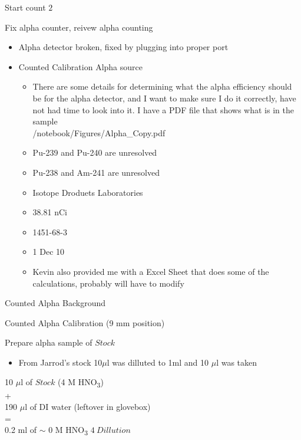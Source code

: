 \documentclass[idxtotoc,hyperref,openany,oneside]{labbook} %
\newcommand{\cmark}{\ding{51}}%
\newcommand{\done}{\rlap{$\square$}{\raisebox{2pt}{\large\hspace{1pt}\cmark}}%
  \hspace{-2.5pt}}
\newcommand{\tsbs}{\textsubscript}
\begin{document}
\begin{todolist}
\item[\done]{Start count $\boxed{2}$}
\item[\done]{Fix alpha counter, reivew alpha counting}
  \begin{itemize}
  \item{Alpha detector broken, fixed by plugging into proper port}
  \item{Counted Calibration Alpha source}
    \begin{itemize}
    \item{There are some details for determining
      what the alpha efficiency should be for the alpha
      detector, and I want to make sure I do it correctly,
      have not had time to look into it. I have a PDF file
      that shows what is in the sample\\
      /notebook/Figures/Alpha\_Copy.pdf}
    \item{Pu-239 and Pu-240 are unresolved}
    \item{Pu-238 and Am-241 are unresolved}
    \item{Isotope Droduets Laboratories}
    \item{38.81 nCi}
    \item{1451-68-3}
    \item{1 Dec 10}
    \item{Kevin also provided me with a Excel Sheet that does
      some of the calculations, probably will have to modify}
    \end{itemize}
  \end{itemize}
\item[\done]{Counted Alpha Background}
\item[\done]{Counted Alpha Calibration (9 mm position)}
\item[\done]{Prepare alpha sample of $\boxed{Stock}$}
  \begin{itemize}
    \item{From Jarrod's stock 10$\mu$l was dilluted to 1ml
    and 10 $\mu$l was taken}
  \end{itemize}
\end{todolist}
\begin{center}
10 $\mu$l of $\boxed{Stock}$ (4 M HNO\tsbs{3})\\
+\\
190 $\mu$l of DI water (leftover in glovebox)\\
=\\
0.2 ml of $\sim$ 0 M HNO\tsbs{3} $\boxed{4\ Dillution}$
\end{center}
\end{document}

